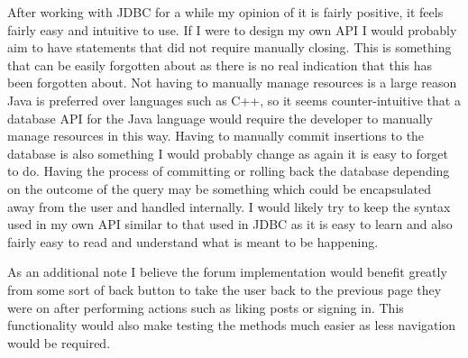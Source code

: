 \documentclass{article}
\begin{document}
After working with JDBC for a while my opinion of it is fairly positive, it feels fairly easy and intuitive to use. If I were to design my own API I would probably aim to have statements that did not require manually closing. This is something that can be easily forgotten about as there is no real indication that this has been forgotten about. Not having to manually manage resources is a large reason Java is preferred over languages such as C++, so it seems counter-intuitive that a database API for the Java language would require the developer to manually manage resources in this way. Having to manually commit insertions to the database is also something I would probably change as again it is easy to forget to do. Having the process of committing or rolling back the database depending on the outcome of the query may be something which could be encapsulated away from the user and handled internally. I would likely try to keep the syntax used in my own API similar to that used in JDBC as it is easy to learn and also fairly easy to read and understand what is meant to be happening.

As an additional note I believe the forum implementation would benefit greatly from some sort of back button to take the user back to the previous page they were on after performing actions such as liking posts or signing in. This functionality would also make testing the methods much easier as less navigation would be required.
\end{document}
